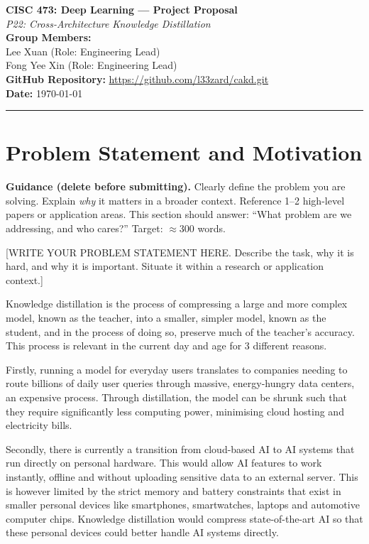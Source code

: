 \documentclass[11pt, letterpaper]{article}
\begin{document}
{\centering
  {\Large\textbf{CISC 473: Deep Learning --- Project Proposal}}\\[0.5em]
  {\large\textit{P22: Cross-Architecture Knowledge Distillation}}\\[0.4em]
  \textbf{Group Members:}\\{}
  Lee Xuan  \quad (Role: Engineering Lead)\\{}
  Fong Yee Xin \quad [Student ID] \quad (Role: Engineering Lead)\\[0.3em]
  \textbf{GitHub Repository:} \url{https://github.com/l33zard/cakd.git}\\[0.3em]
  \textbf{Date:} \today\\[0.4em]
  \rule{\linewidth}{0.4pt}
}

\section{Problem Statement and Motivation}

\begin{guidancebox}
\textbf{Guidance (delete before submitting).}
Clearly define the problem you are solving. Explain \emph{why} it matters
in a broader context. Reference 1--2 high-level papers or application areas.
This section should answer: ``What problem are we addressing, and who cares?''
Target: $\approx$300 words.
\end{guidancebox}

[WRITE YOUR PROBLEM STATEMENT HERE. Describe the task, why it is hard, and why
it is important. Situate it within a research or application context.]

Knowledge distillation is the process of compressing a large and more complex model, known as the teacher, into a smaller, simpler model, known as the student, and in the process of doing so, preserve much of the teacher's accuracy. This process is relevant in the current day and age for 3 different reasons. 

Firstly, running a model for everyday users translates to companies needing to route billions of daily user queries through massive, energy-hungry data centers, an expensive process. Through distillation, the model can be shrunk such that they require significantly less computing power, minimising cloud hosting and electricity bills. 

Secondly, there is currently a transition from cloud-based AI to AI systems that run directly on personal hardware. This would allow AI features to work instantly, offline and without uploading sensitive data to an external server. This is however limited by the strict memory and battery constraints that exist in smaller personal devices like smartphones, smartwatches, laptops and automotive computer chips. Knowledge distillation would compress state-of-the-art AI so that these personal devices could better handle AI systems directly. 
\end{document}
